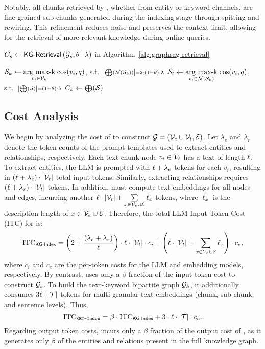 Notably, all chunks retrieved by \sketretrieval, whether from entity or keyword channels, are fine-grained sub-chunks generated during the indexing stage through spitting and rewiring. This refinement reduces noise and preserves the context limit, allowing for the retrieval of more relevant knowledge during online queries.


\begin{algorithm}[!t]
$C_{s} \gets \textsf{KG-Retrieval} \left(\mathcal{G}_s, \theta \cdot \lambda\right)$ in Algorithm~\ref{alg:graphrag-retrieval}\;

$\mathcal{S}_k \gets \underset{v_{i}\in \mathcal{V}_k}{\operatorname{arg}\,\operatorname{max-k}}\; \text{cos}(v_i,q)$, s.t.\ ${\scriptstyle \left|\bigoplus\left(\mathcal{N}\left(\mathcal{S}_k\right)\right)\right| = 2\cdot(1-\theta)\cdot\lambda}$\;
$\mathcal{S}_t \gets \underset{v_{i}\in \mathcal{N}(\mathcal{S}_k)}{\operatorname{arg}\,\operatorname{max-k}}\; \text{cos}(v_i,q)$, s.t.\ ${\scriptstyle \left|\bigoplus(\mathcal{S})\right| = (1-\theta)\cdot\lambda}$\;
$C_k\gets \bigoplus(\mathcal{S})$\;
\caption{\sketretrieval$(\G, q, \lambda, \theta)$}
\label{alg:sketrag-retrieval}
\end{algorithm}

\subsection{Cost Analysis}\label{sec:analysis}

We begin by analyzing the cost of \graphindex to construct $\mathcal{G} = (\mathcal{V}_e\cup\mathcal{V}_t, \mathcal{E})$. Let $\lambda_e$ and $\lambda_r$ denote the token counts of the prompt templates used to extract entities and relationships, respectively. Each text chunk node $v_i \in \mathcal{V}_t$ has a text of length $\ell$. To extract entities, the LLM is prompted with $\ell + \lambda_e$ tokens for each $v_i$, resulting in $(\ell + \lambda_e)\cdot|\mathcal{V}_t|$ total input tokens. Similarly, extracting relationships requires $(\ell + \lambda_r)\cdot|\mathcal{V}_t|$ tokens. In addition, \graphindex must compute text embeddings for all nodes and edges, incurring another $\ell\cdot|\mathcal{V}_t|+\sum\limits_{x\in \mathcal{V}_e\cup\mathcal{E}}\ell_x$ tokens, where $\ell_x$ is the description length of $x\in \mathcal{V}_e\cup\mathcal{E}$. Therefore, the total LLM Input Token Cost (ITC) for \graphindex is:
$$\text{ITC}_{\textsf{KG-Index}} = \left(2+\frac{(\lambda_e+\lambda_r)}{\ell}\right)\cdot\ell\cdot|\mathcal{V}_t|\cdot c_i + \left(\ell\cdot|\mathcal{V}_t|+\sum\limits_{x\in \mathcal{V}_e\cup\mathcal{E}}\ell_x\right)\cdot c_e,$$
where $c_i$ and $c_e$ are the per-token costs for the LLM and embedding models, respectively.
By contrast, \sketindex uses only a $\beta$-fraction of the \graphindex input token cost to construct $\mathcal{G}_s$. To build the text-keyword bipartite graph $\mathcal{G}_k$, it additionally consumes $3\ell\cdot|\mathcal{T}|$ tokens for multi-granular text embeddings (chunk, sub-chunk, and sentence levels). Thus,
$$\text{ITC}_{\texttt{KET-Index}} = \beta\cdot \text{ITC}_{\textsf{KG-Index}} + 3\cdot\ell\cdot|\mathcal{T}|\cdot c_e.$$
Regarding output token costs, \sketindex incurs only a $\beta$ fraction of the output cost of \graphindex, as it generates only $\beta$ of the entities and relations present in the full knowledge graph.

